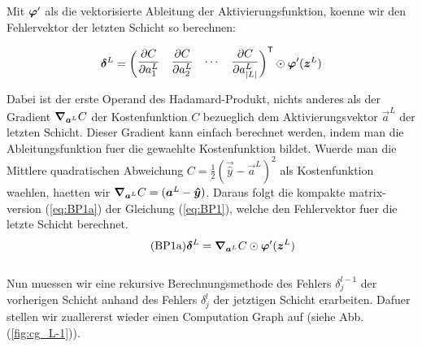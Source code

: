 Mit $\bm{\varphi}'$ als die vektorisierte Ableitung der Aktivierungsfunktion,
koenne wir den Fehlervektor der letzten Schicht so berechnen:

\begin{equation*}
  \bm{\delta}^L = \begin{pmatrix} \displaystyle\frac{\partial C}{\partial a_1^L} & \displaystyle\frac{\partial C}{\partial a_2^L} & \cdots & \displaystyle\frac{\partial C}{\partial a_{|L|}^L}\end{pmatrix}^{\mathsf{T}} \odot \bm{\varphi}'(\bm{z}^L)
\end{equation*}

Dabei ist der erste Operand des Hadamard-Produkt, nichts anderes als
der Gradient $\bm{\nabla}_{\bm{a}^L} C$ der Kostenfunktion $C$ bezueglich dem Aktivierungsvektor
$\vec{a}^L$ der letzten Schicht. Dieser Gradient kann einfach berechnet werden, indem man die
Ableitungsfunktion fuer die gewaehlte Kostenfunktion bildet. Wuerde man die
Mittlere quadratischen Abweichung $C = \frac{1}{2}(\vec{\hat{y}} - \vec{a}^L)^2$ als Kostenfunktion waehlen, haetten wir
$\bm{\nabla}_{\bm{a}^L} C = (\bm{a}^L - \bm{\hat{y}})$.
\para{}
Daraus folgt die kompakte matrix-version (\ref{eq:BP1a}) der Gleichung
(\ref{eq:BP1}), welche den Fehlervektor fuer die letzte Schicht berechnet.
\\
\begin{equation}\tag{BP1a}\label{eq:BP1a}
  \bm{\delta}^L = \bm{\nabla}_{\bm{a}^L}C \odot \bm{\varphi}'(\bm{z}^L)
\end{equation}
\\
Nun muessen wir eine rekursive Berechnungsmethode des Fehlers $\delta_j^{l-1}$
der vorherigen Schicht anhand des Fehlers $\delta_j^l$ der jetztigen Schicht
erarbeiten. Dafuer stellen wir zuallererst wieder einen Computation Graph auf
(siehe Abb. (\ref{fig:cg_L-1})).

